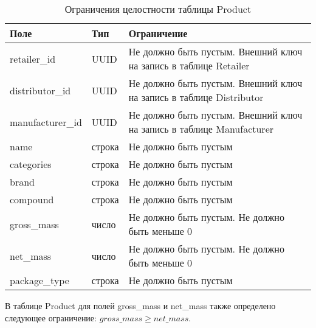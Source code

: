 \begin{table}[ht]
	\begin{center}
		\begin{threeparttable}
			\caption{Ограничения целостности таблицы Product}
			\label{tbl:entity_product}
			\begin{tabular}{|p{4.5cm}|p{2.5cm}|p{8.5cm}|}
				\hline 
				\textbf{Поле} & \textbf{Тип} & \textbf{Ограничение}  \\
				\hline
				retailer\_id & UUID & Не должно быть пустым. Внешний ключ на запись в таблице Retailer  \\
				\hline
				distributor\_id & UUID & Не должно быть пустым. Внешний ключ на запись в таблице Distributor \\
				\hline
				manufacturer\_id & UUID & Не должно быть пустым. Внешний ключ на запись в таблице Manufacturer  \\
				\hline
				name & строка & Не должно быть пустым  \\
				\hline
				categories & строка & Не должно быть пустым  \\
				\hline
				brand & строка & Не должно быть пустым  \\
				\hline
				compound & строка & Не должно быть пустым  \\
				\hline
				gross\_mass & число & Не должно быть пустым. Не должно быть меньше 0  \\
				\hline
				net\_mass & число & Не должно быть пустым. Не должно быть меньше 0  \\
				\hline
				package\_type & строка & Не должно быть пустым  \\
				\hline
			\end{tabular}
		\end{threeparttable}			
	\end{center}
\end{table}

В таблице Product для полей gross\_mass и net\_mass также определено следующее ограничение: $ gross\_mass \geq net\_mass $.


